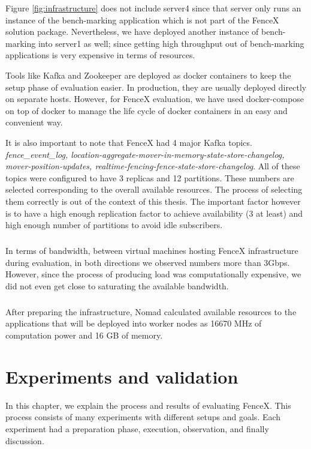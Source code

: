 \documentclass[a4]{report}
\begin{document}
    Figure \ref{fig:infrastructure} does not include server4 since that server only runs an instance of the bench-marking application which is not part of the FenceX solution package.
    Nevertheless, we have deployed another instance of bench-marking into server1 as well;
    since getting high throughput out of bench-marking applications is very expensive in terms of resources.

    Tools like Kafka and Zookeeper are deployed as docker containers to keep the setup phase of evaluation easier.
    In production, they are usually deployed directly on separate hosts.
    However, for FenceX evaluation, we have used docker-compose on top of docker to manage the life cycle of docker containers in an easy and convenient way.

    It is also important to note that FenceX had 4 major Kafka topics.
    \textit{fence\_event\_log, location-aggregate-mover-in-memory-state-store-changelog, mover-position-updates,
        realtime-fencing-fence-state-store-changelog}.
    All of these topics were configured to have 3 replicas and 12 partitions.
    These numbers are selected corresponding to the overall available resources.
    The process of selecting them correctly is out of the context of this thesis.
    The important factor however is to have a high enough replication factor to achieve availability (3 at least) and high enough number of partitions to avoid idle subscribers.

    \paragraph{}
    In terms of bandwidth, between virtual machines hosting FenceX infrastructure during evaluation, in both
    directions we observed numbers more than 3Gbps.
    However, since the process of producing load was computationally expensive, we did not even get close to saturating
    the available bandwidth.

    \paragraph{}
    After preparing the infrastructure, Nomad calculated available resources to the applications that will be
    deployed into worker nodes as 16670 MHz of computation power and 16 GB of memory.


    \chapter{Experiments and validation}
    In this chapter, we explain the process and results of evaluating FenceX.
    This process consists of many experiments with different setups and goals.
    Each experiment had a preparation phase, execution, observation, and finally discussion.
\end{document}
